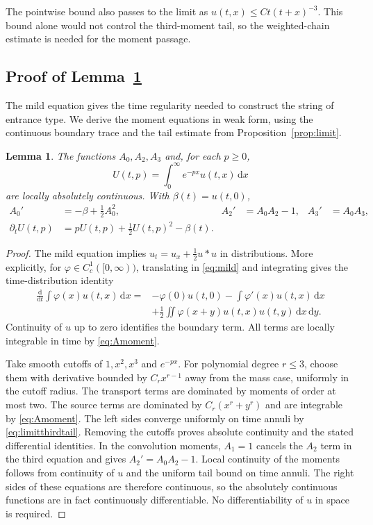 \documentclass[11pt,letterpaper,reqno]{amsart}
\theoremstyle{plain}
\newtheorem{lemma}[theorem]{Lemma}
\newcommand{\dd}{\,\mathrm d}
\begin{document}
The pointwise bound also passes to the limit as $u(t,x)\le Ct(t+x)^{-3}$. This bound alone would not control the third-moment tail, so the weighted-chain estimate is needed for the moment passage.

\subsection{Proof of Lemma~\ref{lem:momentODE}}
The mild equation gives the time regularity needed to construct the string of entrance type. We derive the moment equations in weak form, using the continuous boundary trace and the tail estimate from Proposition~\ref{prop:limit}.

\begin{lemma}\label{lem:momentODE}
The functions $A_0,A_2,A_3$ and, for each $p\ge0$,
\[
 U(t,p)=\int_0^\infty e^{-px}u(t,x)\dd x
\]
are locally absolutely continuous. With $\beta(t)=u(t,0)$,
\begin{align}
 A_0'&=-\beta+\tfrac12 A_0^2,&
 A_2'&=A_0A_2-1,& A_3'&=A_0A_3,\label{eq:momentODE}\\
 \partial_tU(t,p)&=pU(t,p)+\tfrac12U(t,p)^2-\beta(t).\label{eq:laplaceODE}
\end{align}
\end{lemma}
\begin{proof}
The mild equation implies $u_t=u_x+\tfrac12u*u$ in distributions. More explicitly, for $\varphi\in C_c^1([0,\infty))$, translating in \eqref{eq:mild} and integrating gives the time-distribution identity
\begin{align*}
 \frac{\mathrm d}{\mathrm dt}\int\varphi(x)u(t,x)\dd x
 ={}&-\varphi(0)u(t,0)-\int\varphi'(x)u(t,x)\dd x\\
 &+\frac12\iint\varphi(x+y)u(t,x)u(t,y)\dd x\dd y.
\end{align*}
Continuity of $u$ up to zero identifies the boundary term. All terms are locally integrable in time by \eqref{eq:Amoment}.

Take smooth cutoffs of $1,x^2,x^3$ and $e^{-px}$. For polynomial degree $r\le3$, choose them with derivative bounded by $C_rx^{r-1}$ away from the mass case, uniformly in the cutoff radius. The transport terms are dominated by moments of order at most two. The source terms are dominated by $C_r(x^r+y^r)$ and are integrable by \eqref{eq:Amoment}. The left sides converge uniformly on time annuli by \eqref{eq:limitthirdtail}. Removing the cutoffs proves absolute continuity and the stated differential identities. In the convolution moments, $A_1=1$ cancels the $A_2$ term in the third equation and gives $A_2'=A_0A_2-1$. Local continuity of the moments follows from continuity of $u$ and the uniform tail bound on time annuli. The right sides of these equations are therefore continuous, so the absolutely continuous functions are in fact continuously differentiable. No differentiability of $u$ in space is required.
\end{proof}
\end{document}
